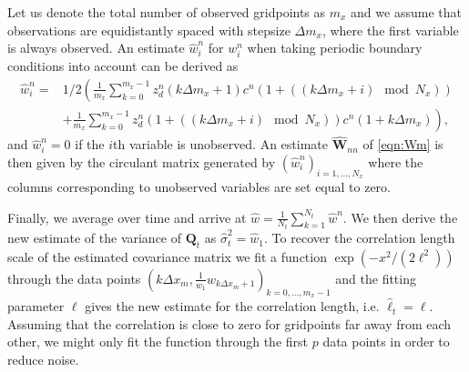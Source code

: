 \documentclass[a4paper,10pt]{article}
\numberwithin{equation}{section}
\begin{document}
Let us denote the total number of observed gridpoints as $m_x$ and we assume that observations are equidistantly spaced with stepsize $\Delta m_x$, where the first variable is always observed. 
An estimate $\hat w_{i}^n$ for $w_{i}^n$ when taking periodic boundary conditions into account can be derived as
\begin{align*}
\hat w_{i}^n=&1/2\left (\frac{1}{m_x}\sum_{k=0}^{m_x-1}z_d^n(k\Delta m_x+1)c^n(1+((k\Delta m_x+i)\mod N_x))\right.
\\&\left.+\frac{1}{m_x}\sum_{k=0}^{m_x-1}z_d^n(1+((k\Delta m_x+i)\mod N_x))c^n(1+k\Delta m_x)\right),
\end{align*}
and $\hat w_i^n=0$ if the $i$th variable is unobserved. 
An estimate $\hat{\mathbf W}_{nn}$ of \eqref{eqn:Wm} is then given by the circulant matrix generated by $(\hat w_i^n)_{i=1,...,N_x}$ where the columns corresponding to unobserved variables are set equal to zero. 

Finally, we average over time and arrive at $\hat w=\frac{1}{N_t}\sum_{k=1}^{N_t}\hat w^n$. 
We then derive the new estimate of the variance of $\mathbf Q_t$ as 
$ \hat \sigma_t^2=\hat w_{1}.$
To recover the correlation length scale of the estimated covariance matrix we fit a function $\exp(-x^2/(2\ell^2))$ through the data points $(k\Delta x_m,\frac{1}{w_1}w_{k\Delta x_m+1})_{k=0,...,m_x-1}$  and the fitting parameter  $\ell$ gives the new estimate for the correlation length, i.e. $\hat \ell_t=\ell$. Assuming that the correlation is close to zero for gridpoints far away from each other, we might only fit the function through the first $p$ data points in order to reduce noise. 
\newpage
\end{document}
